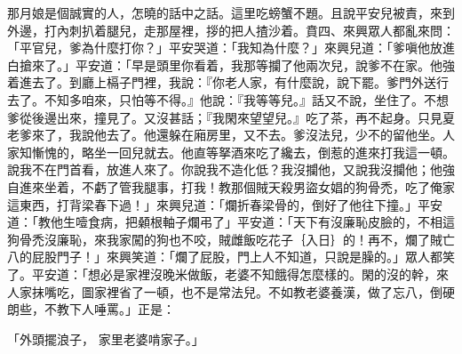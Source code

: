 那月娘是個誠實的人，怎曉的話中之話。這里吃螃蟹不題。且說平安兒被責，來到外邊，打內刺扒着腿兒，走那屋裡，拶的把人揸沙着。賁四、來興眾人都亂來問：「平官兒，爹為什麼打你？」平安哭道：「我知為什麼？」來興兒道：「爹嗔他放進白搶來了。」平安道：「早是頭里你看着，我那等攔了他兩次兒，說爹不在家。他強着進去了。到廳上槅子門裡，我說：『你老人家，有什麼說，說下罷。爹門外送行去了。不知多咱來，只怕等不得。』他說：『我等等兒。』話又不說，坐住了。不想爹從後邊出來，撞見了。又沒甚話；『我閑來望望兒。』吃了茶，再不起身。只見夏老爹來了，我說他去了。他還躲在廂房里，又不去。爹沒法兒，少不的留他坐。人家知慚愧的，略坐一回兒就去。他直等拏酒來吃了纔去，倒惹的進來打我這一頓。說我不在門首看，放進人來了。你說我不造化低？我沒攔他，又說我沒攔他；他強自進來坐着，不虧了管我腿事，打我！教那個賊天殺男盜女娼的狗骨禿，吃了俺家這東西，打背梁春下過！」來興兒道：「爛折春梁骨的，倒好了他往下撞。」平安道：「教他生噎食病，把顙根軸子爛弔了」平安道：「天下有沒廉恥皮臉的，不相這狗骨禿沒廉恥，來我家闖的狗也不咬，賊雌飯吃花子｛入日｝的！再不，爛了賊亡八的屁股門子！」來興笑道：「爛了屁股，門上人不知道，只說是臊的。」眾人都笑了。平安道：「想必是家裡沒晚米做飯，老婆不知餓得怎麼樣的。閑的沒的幹，來人家抹嘴吃，圖家裡省了一頓，也不是常法兒。不如教老婆養漢，做了忘八，倒硬朗些，不教下人唾罵。」正是：

「外頭擺浪子，  家里老婆啃家子。」

